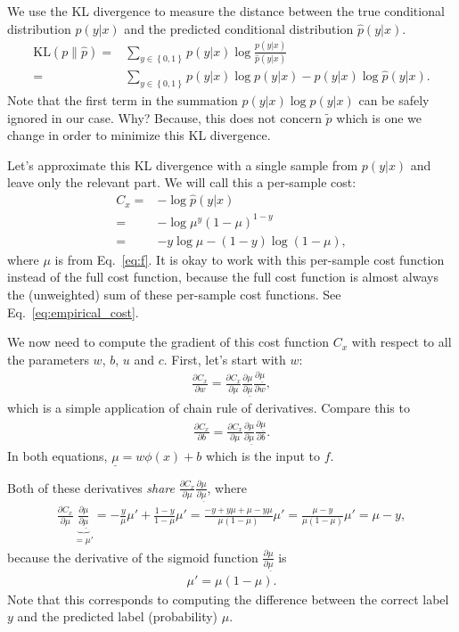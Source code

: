 \documentclass{report}
\newcommand{\KL}{\text{KL}}
\begin{document}
We use the KL divergence to measure the distance between the true conditional
distribution $p(y|x)$ and the predicted conditional distribution $\hat{p}(y|x)$.
\begin{align*}
    \KL(p\|\hat{p}) =& \sum_{y \in \left\{0, 1\right\}} p(y|x) \log
    \frac{p(y|x)}{\hat{p}(y|x)} \\
    =& \sum_{y \in \left\{0, 1\right\}} p(y|x) \log p(y|x) - p(y|x) \log
    {\hat{p}(y|x)}.
\end{align*}
Note that the first term in the summation $p(y|x) \log p(y|x)$ can be safely
ignored in our case. Why? Because, this does not concern $\tilde{p}$ which is
one we change in order to minimize this KL divergence.

Let's approximate this KL divergence with a single sample from $p(y|x)$ and
leave only the relevant part. We will call this a per-sample cost:
\begin{align}
    \label{eq:cost_bernoulli}
    C_x =& - \log \hat{p}(y|x) \\
    =& - \log \mu^y (1-\mu)^{1-y} \\
    =& - y \log \mu - (1-y) \log (1-\mu),
\end{align}
where $\mu$ is from Eq.~\eqref{eq:f}.  It is okay to work with this per-sample
cost function instead of the full cost function, because the full cost function
is almost always the (unweighted) sum of these per-sample cost functions. See
Eq.~\eqref{eq:empirical_cost}.

We now need to compute the gradient of this cost function $C_x$ with respect to
all the parameters $w$, $b$, $u$ and $c$. First, let's start with $w$:
\begin{align*}
    \frac{\partial C_x}{\partial w} = \frac{\partial C_x}{\partial \mu}
    \frac{\partial \mu}{\partial \underline{\mu}}
    \frac{\partial \underline{\mu}}{\partial w},
\end{align*}
which is a simple application of chain rule of derivatives. Compare this to
\begin{align*}
    \frac{\partial C_x}{\partial b} = \frac{\partial C_x}{\partial \mu}
    \frac{\partial \mu}{\partial \underline{\mu}}
    \frac{\partial \underline{\mu}}{\partial b}.
\end{align*}
In both equations, $\underline{\mu} = w \phi(x) + b$ which is the input to $f$.


Both of these derivatives {\em share} $\frac{\partial C_x}{\partial
\mu}\frac{\partial \mu}{\partial \underline{\mu}}$, where
\begin{align}
    \label{eq:out_deriv}
    \frac{\partial C_x}{\partial \mu} \underbrace{\frac{\partial \mu}{\partial
    \underline{\mu}}}_{=\mu'} = 
    -\frac{y}{\mu}\mu' +
    \frac{1-y}{1-\mu}\mu' 
    = \frac{-y + y\mu + \mu - y\mu }{\mu(1-\mu)}\mu' 
    = \frac{\mu - y}{\mu(1-\mu)}\mu' 
    = \mu - y,
\end{align}
because the derivative of the sigmoid function $\frac{\partial \mu}{\partial
\underline{\mu}}$ is
\begin{align*}
    \mu' = \mu (1-\mu).
\end{align*}
Note that this corresponds to computing the difference between the correct label
$y$ and the predicted label (probability) $\mu$.
\end{document}

